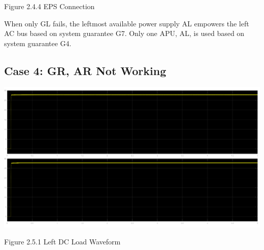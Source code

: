 \documentclass{mcmthesis}
\begin{document}
\begin{center}
\small{Figure 2.4.4 EPS Connection}
\end{center}
When only GL fails,  the leftmost available power supply AL empowers the left AC bus based on system guarantee G7. Only one APU, AL, is used based on system guarantee G4.
\pagebreak

\subsection{Case 4: GR, AR Not Working}
\begin{center}
\includegraphics[trim= 0 0.28\imageheight{} 0 0, clip, width = 0.165\imageheight{}]{gr_ar_load1.png}
\end{center}
\begin{center}
\small{Figure 2.5.1 Left DC Load Waveform}
\end{center}
\end{document}
